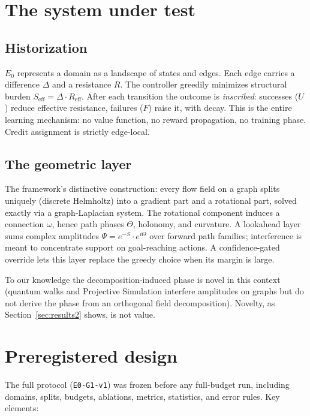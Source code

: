 \documentclass[11pt]{article}
\newcommand{\Ez}{$E_0$}
\begin{document}
\section{The system under test}

\subsection{Historization}

\Ez{} represents a domain as a landscape of states and edges. Each edge
carries a difference $\Delta$ and a resistance $R$. The controller greedily
minimizes structural burden $S_{\mathrm{eff}} = \Delta \cdot
R_{\mathrm{eff}}$. After each transition the outcome is \emph{inscribed}:
successes ($U$) reduce effective resistance, failures ($F$) raise it, with
decay. This is the entire learning mechanism: no value function, no reward
propagation, no training phase. Credit assignment is strictly edge-local.

\subsection{The geometric layer}

The framework's distinctive construction: every flow field on a graph splits
uniquely (discrete Helmholtz) into a gradient part and a rotational part,
solved exactly via a graph-Laplacian system. The rotational component
induces a connection $\omega$, hence path phases $\Theta$, holonomy, and
curvature. A lookahead layer sums complex amplitudes $\Psi = e^{-S} \cdot
e^{i\Theta}$ over forward path families; interference is meant to
concentrate support on goal-reaching actions. A confidence-gated override
lets this layer replace the greedy choice when its margin is large.

To our knowledge the decomposition-induced phase is novel in this context
(quantum walks and Projective Simulation interfere amplitudes on graphs but
do not derive the phase from an orthogonal field decomposition). Novelty, as
Section~\ref{sec:results2} shows, is not value.

\section{Preregistered design}\label{sec:design}

The full protocol (\texttt{E0-G1-v1}) was frozen before any full-budget run,
including domains, splits, budgets, ablations, metrics, statistics, and
error rules. Key elements:
\end{document}
